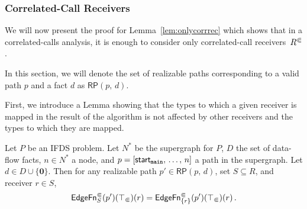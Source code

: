 \subsubsection{Correlated-Call Receivers}
We will now present the proof for Lemma~\ref{lem:onlycorrrec} which shows that in a correlated-calls analysis, it is enough to consider only correlated-call receivers~${R^\Subset}$.

In this section, we will denote the set of realizable paths corresponding to a valid path $p$ and a fact $d$ as $\textsf{RP}(p,\,d)$.

First, we introduce a Lemma showing that the types to which a given receiver is mapped in the result of the algorithm is not affected by other receivers and the types to which they are mapped.

\begin{lemma}\label{lem:recindepedgefn}
  Let $P$ be an IFDS problem. Let $N^*$ be the supergraph for $P$, $D$ the set of data-flow facts, $n\in N^*$ a node, and $p=[\textsf{start}_\texttt{main},\,\dots,\,n]$ a path in the supergraph. Let $d\in D\cup\{\mathbf0\}$.
  Then for any realizable path $p'\in\textsf{RP}(p,\,d)$, set $S\subseteq R$, and receiver $r\in S$,
  \begin{equation}
    \textsf{EdgeFn}^\Subset_{S}(p')(\top_\Subset)(r)=
    \textsf{EdgeFn}^\Subset_{\{r\}}(p')(\top_\Subset)(r)\,.
  \end{equation}
\end{lemma}
